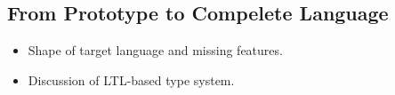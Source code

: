 \subsection{From Prototype to Compelete Language}

\begin{itemize}[itemsep=0pt]
  \item Shape of target language and missing features.
  \item Discussion of LTL-based type system.
\end{itemize}




